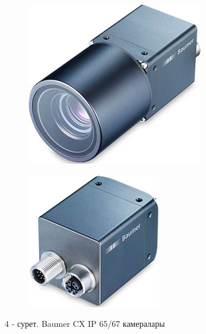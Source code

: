 \begin{figure}[H]
    \centering
    \begin{subfigure}[t]{0.35\textwidth}
        \centering
        \includegraphics[width=\textwidth]{media/ict2/image171}
    \end{subfigure}
    \begin{subfigure}[t]{0.35\textwidth}
        \centering
        \includegraphics[width=\textwidth]{media/ict2/image172}
    \end{subfigure}
    \caption*{4 - сурет. Baumer CX IP 65/67 камералары}
\end{figure}

